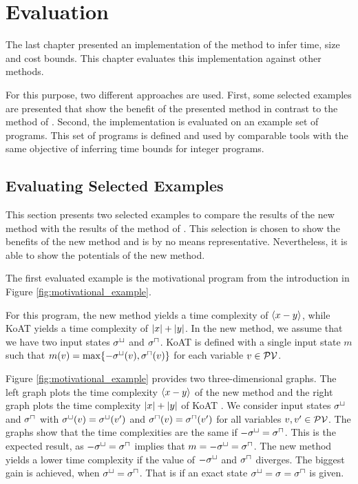 \section{Evaluation}

The last chapter presented an implementation of the method to infer time, size and cost bounds.
This chapter evaluates this implementation against other methods.

For this purpose, two different approaches are used.
First, some selected examples are presented that show the benefit of the presented method in contrast to the method of \cite{koat}.
Second, the implementation is evaluated on an example set of programs.
This set of programs is defined and used by comparable tools with the same objective of inferring time bounds for integer programs.

\subsection{Evaluating Selected Examples}

This section presents two selected examples to compare the results of the new method with the results of the method of \cite{koat}.
This selection is chosen to show the benefits of the new method and is by no means representative.
Nevertheless, it is able to show the potentials of the new method.

The first evaluated example is the motivational program from the introduction in Figure \ref{fig:motivational_example}.

\iffalse\fi

For this program, the new method yields a time complexity of $\langle x-y\rangle$, while KoAT \cite{koat} yields a time complexity of $\left|x\right|+\left|y\right|$.
In the new method, we assume that we have two input states ${\sigma^\sqcup}$ and ${\sigma^\sqcap}$.
KoAT \cite{koat} is defined with a single input state $m$ such that $m(v) = \max \lbrace -{\sigma^\sqcup}(v),{\sigma^\sqcap}(v) \rbrace$ for each variable $v \in \mathcal{PV}$.

Figure \ref{fig:motivational_example} provides two three-dimensional graphs.
The left graph plots the time complexity $\langle x-y\rangle$ of the new method and the right graph plots the time complexity $\left|x\right|+\left|y\right|$ of KoAT \cite{koat}.
We consider input states ${\sigma^\sqcup}$ and ${\sigma^\sqcap}$ with ${\sigma^\sqcup}(v) = {\sigma^\sqcup}(v')$ and ${\sigma^\sqcap}(v) = {\sigma^\sqcap}(v')$ for all variables $v, v' \in \mathcal{PV}$.
The graphs show that the time complexities are the same if $-{\sigma^\sqcup} = {\sigma^\sqcap}$.
This is the expected result, as $-{\sigma^\sqcup} = {\sigma^\sqcap}$ implies that $m = -{\sigma^\sqcup} = {\sigma^\sqcap}$.
The new method yields a lower time complexity if the value of $-{\sigma^\sqcup}$ and ${\sigma^\sqcap}$ diverges.
The biggest gain is achieved, when ${\sigma^\sqcup} = {\sigma^\sqcap}$.
That is if an exact state ${\sigma^\sqcup} = \sigma = {\sigma^\sqcap}$ is given.

